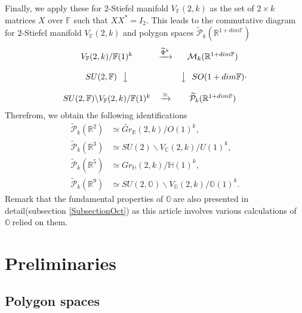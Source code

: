 \documentclass[a4paper]{article}%
\begin{document}
Finally, we apply these for $2$-Stiefel manifold $V_{\mathbb{F}}(2,k)$ as the
set of $2\times k$ matrices $X$ over $\mathbb{F}$ such that $XX^{\ast}=I_{2}$.
This leads to the commutative diagram for $2$-Stiefel manifold $V_{\mathbb{F}%
}(2,k)$ and polygon spaces $\widetilde{\mathcal{P}}_{k}(\mathbb{R}%
^{1+dim\mathbb{F}})$
\[%
\begin{matrix}
V_{\mathbb{F}}(2,k)/\mathbb{F}(1)^{k} & \xrightarrow{ \widetilde{\Phi}^k} &
\mathcal{M}_{k}(\mathbb{R}^{1+dim\mathbb{F}})\\
&  & \\
SU(2,\mathbb{F})\ \ \big\downarrow &  & \big\downarrow\ \ SO(1+dim\mathbb{F}%
)\\
&  & \\
SU(2,\mathbb{F})\backslash V_{\mathbb{F}}(2,k)/\mathbb{F}(1)^{k} &
\xrightarrow{\simeq} & \widetilde{\mathcal{P}}_{k}(\mathbb{R}^{1+dim\mathbb{F}%
})
\end{matrix}
.
\]
Therefrom, we obtain the following identifications%
\begin{align*}
\widetilde{\mathcal{P}}_{k}(\mathbb{R}^{2})  &  \simeq\widetilde
{Gr}_{\mathbb{R}}(2,k)/O(1)^{k},\\
\widetilde{\mathcal{P}}_{k}(\mathbb{R}^{3})  &  \simeq SU(2)\backslash
V_{\mathbb{C}}(2,k)/U(1)^{k},\\
\widetilde{\mathcal{P}}_{k}(\mathbb{R}^{5})  &  \simeq Gr_{\mathbb{H}%
}(2,k)/\mathbb{H}(1)^{k},\\
\widetilde{\mathcal{P}}_{k}(\mathbb{R}^{9})  &  \simeq SU(2,\mathbb{O}%
)\backslash V_{\mathbb{O}}(2,k)/\mathbb{O}(1)^{k}.
\end{align*}
Remark that the fundamental properties of $\mathbb{O\ }$are also presented in
detail(subsection \ref{SubsectionOct}) as this article involves various
calculations of $\mathbb{O\ }$relied on them.

\bigskip

\section{Preliminaries}

\subsection{Polygon spaces}
\end{document}
